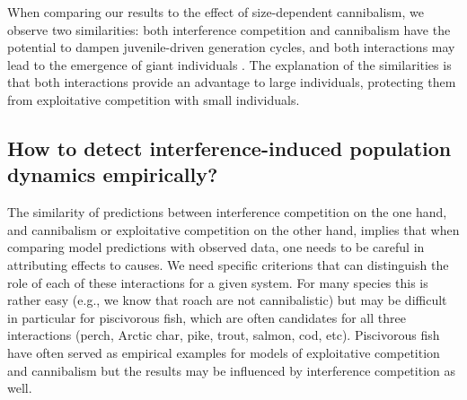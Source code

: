 When comparing our results to the effect of size-dependent cannibalism, we
observe two similarities: both interference competition and cannibalism have the
potential to dampen juvenile-driven generation cycles, and both interactions may
lead to the emergence of giant individuals 
\autocites[][this study]{claessen2000a,claessen2002a}. The explanation of the
similarities is that both interactions provide an advantage to large individuals, protecting them from exploitative competition with small individuals.

\subsection{How to detect interference-induced population dynamics empirically?}

The similarity of predictions between interference competition on the one hand,
and cannibalism or exploitative competition on the other hand, implies that when
comparing model predictions with observed data, one needs to be careful in
attributing effects to causes. We need specific criterions that can distinguish
the role of each of these interactions for a given system. For many species this
is rather easy (e.g., we know that roach are not cannibalistic) but may be
difficult in particular for piscivorous fish, which are often candidates for all
three interactions (perch, Arctic char, pike, trout, salmon, cod, etc).
Piscivorous fish have often served as empirical examples for models of
exploitative competition and cannibalism
\autocites{claessen2000a,claessen2002a,persson2003a,de-roos2013a} but the results
may be influenced by interference competition as well.

